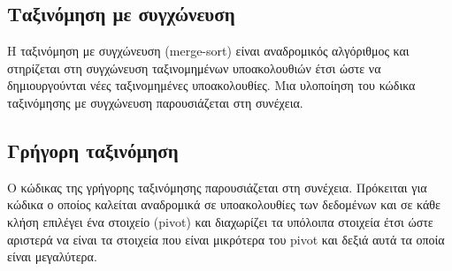 





\subsection{Ταξινόμηση με συγχώνευση}
Η ταξινόμηση με συγχώνευση (merge-sort) είναι αναδρομικός αλγόριθμος και στηρίζεται στη συγχώνευση ταξινομημένων υποακολουθιών έτσι ώστε να δημιουργούνται νέες ταξινομημένες υποακολουθίες. Μια υλοποίηση του κώδικα ταξινόμησης με συγχώνευση παρουσιάζεται στη συνέχεια. 







\subsection{Γρήγορη ταξινόμηση}
Ο κώδικας της γρήγορης ταξινόμησης  παρουσιάζεται στη συνέχεια. Πρόκειται για κώδικα ο οποίος καλείται αναδρομικά σε υποακολουθίες των δεδομένων και σε κάθε κλήση επιλέγει ένα στοιχείο (pivot) και διαχωρίζει τα υπόλοιπα στοιχεία έτσι ώστε αριστερά να είναι τα στοιχεία που είναι μικρότερα του pivot και δεξιά αυτά τα οποία είναι μεγαλύτερα. 







